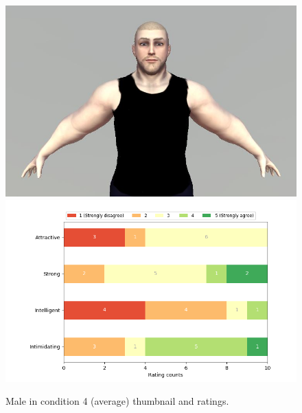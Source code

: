 \begin{figure}[H]
  \includegraphics[width=\linewidth]{Images/Males/7.JPG}
\endminipage\hfill
{}
  \includegraphics[width=\linewidth]{Survey/avatar_m_experiment4.png}
\endminipage\hfill
\caption{Male in condition 4 (average) thumbnail and ratings.}
\end{figure}

